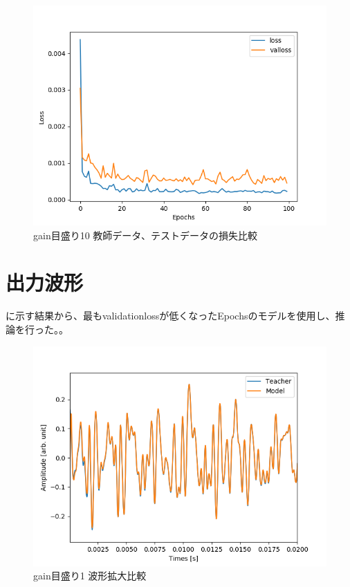 \documentclass{jreport}		%
\begin{document}
\begin{figure}[htbp]
 \begin{center}
  \includegraphics[width=150mm]{gain10_loss_hikaku.png}
 \end{center}
 \caption{gain目盛り10 教師データ、テストデータの損失比較}
 \label{fig:one}
\end{figure}

\clearpage
\section{出力波形}
に示す結果から、最もvalidationlossが低くなったEpochsのモデルを使用し、推論を行った。。

\begin{figure}[htbp]
 \begin{center}
  \includegraphics[width=150mm]{gain1_output_hikaku.png}
 \end{center}
 \caption{gain目盛り1 波形拡大比較}
 \label{fig:one}
\end{figure}
\end{document}
